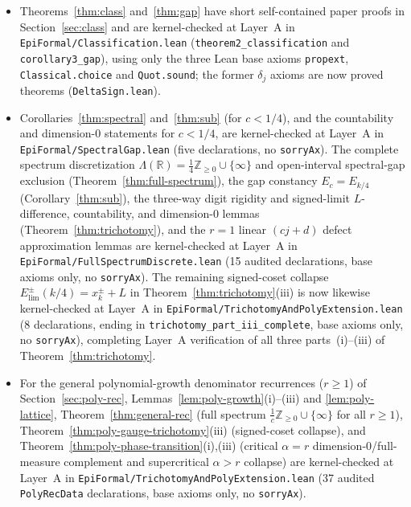 \documentclass[11pt]{article}
\theoremstyle{definition}
\theoremstyle{remark}
\newcommand{\R}{\mathbb{R}}
\newcommand{\Z}{\mathbb{Z}}
\newcommand{\Lam}{\Lambda}
\begin{document}
\begin{itemize}[leftmargin=1.5em]
\item Theorems~\ref{thm:class} and~\ref{thm:gap} have short self-contained paper
proofs in Section~\ref{sec:class} and are kernel-checked at Layer~A in
\texttt{EpiFormal/\allowbreak Classification.lean}
(\texttt{theorem2\_classification} and \texttt{corollary3\_gap}), using only the
three Lean base axioms \texttt{propext}, \texttt{Classical.choice} and
\texttt{Quot.sound}; the former $\delta_j$ axioms are now proved theorems
(\texttt{DeltaSign.lean}).
\item Corollaries~\ref{thm:spectral} and~\ref{thm:sub} (for $c<1/4$), and the
countability and dimension-$0$ statements for $c<1/4$, are kernel-checked at
Layer~A in \texttt{EpiFormal/\allowbreak SpectralGap.lean} (five declarations,
no \texttt{sorryAx}). The complete spectrum discretization
$\Lam(\R)=\frac14\Z_{\ge0}\cup\{\infty\}$ and open-interval spectral-gap
exclusion (Theorem~\ref{thm:full-spectrum}), the gap constancy $E_c=E_{k/4}$
(Corollary~\ref{thm:sub}), the three-way digit rigidity and signed-limit
$L$-difference, countability, and dimension-$0$ lemmas
(Theorem~\ref{thm:trichotomy}), and the $r=1$ linear $(cj+d)$ defect
approximation lemmas are kernel-checked at Layer~A in
\texttt{EpiFormal/\allowbreak FullSpectrumDiscrete.lean} (15 audited
declarations, base axioms only, no \texttt{sorryAx}). The remaining signed-coset
collapse $E_{\mathrm{lim}}^\pm(k/4)=x_k^\pm+L$ in
Theorem~\ref{thm:trichotomy}(iii) is now likewise kernel-checked at Layer~A in
\texttt{EpiFormal/\allowbreak TrichotomyAndPolyExtension.lean} (8 declarations,
ending in \texttt{trichotomy\_\allowbreak part\_\allowbreak iii\_\allowbreak complete},
base axioms only, no \texttt{sorryAx}), completing Layer~A verification of all
three parts~(i)--(iii) of Theorem~\ref{thm:trichotomy}.
\item For the general polynomial-growth denominator recurrences ($r\ge1$) of
Section~\ref{sec:poly-rec}, Lemmas~\ref{lem:poly-growth}(i)--(iii) and
\ref{lem:poly-lattice}, Theorem~\ref{thm:general-rec} (full spectrum
$\frac{1}{c}\Z_{\ge0}\cup\{\infty\}$ for all $r\ge1$),
Theorem~\ref{thm:poly-gauge-trichotomy}(iii) (signed-coset collapse), and
Theorem~\ref{thm:poly-phase-transition}(i),(iii) (critical $\alpha=r$
dimension-$0$/full-measure complement and supercritical $\alpha>r$ collapse)
are kernel-checked at Layer~A in
\texttt{EpiFormal/\allowbreak TrichotomyAndPolyExtension.lean} (37 audited
\texttt{PolyRecData} declarations, base axioms only, no \texttt{sorryAx}).

\end{itemize}
\end{document}
